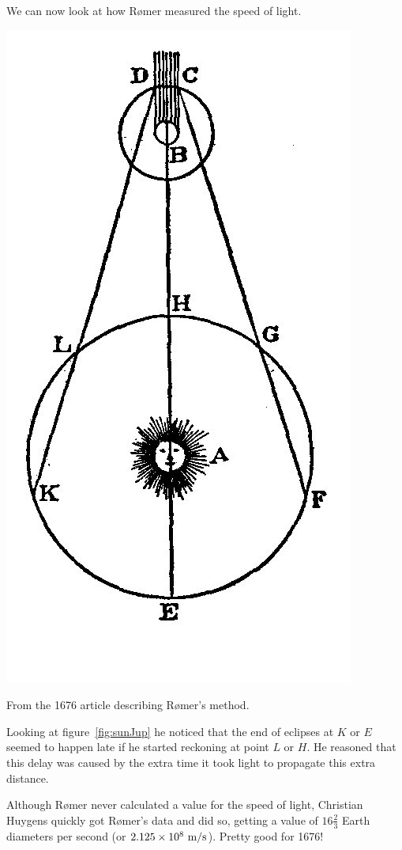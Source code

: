 \documentclass{tufte-handout}
\begin{document}
We can now look at how R{\o}mer measured the speed of light.
\begin{marginfigure}
\includegraphics{Roemer.jpg}
\caption{From the 1676 article describing R{\o}mer's method.}
\label{fig:sunJup}
\end{marginfigure}
Looking at figure~\ref{fig:sunJup} he noticed that the end of eclipses at $K$ or $E$ seemed to happen late if he started reckoning at point $L$ or $H$.  He reasoned that this delay was caused by the extra time it took light to propagate this extra distance. 

Although R{\o}mer never calculated a value for the speed of light, Christian Huygens quickly got R{\o}mer's data and did so, getting a value of $16 \frac{2}{3}$ Earth diameters per second (or $2.125\times10^8~{\rm m}/{\rm s}$).  Pretty good for 1676!
\end{document}
